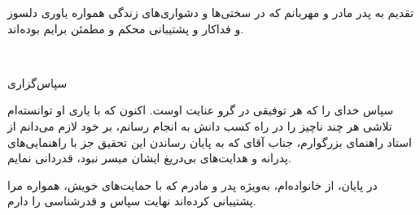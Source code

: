%
% 
%
%
\newpage
\thispagestyle{empty}
\begin{center} \Large 
{\vskip-0.1cm{\nastaliq  تقدیم به پدر مادر و مهربانم که در سختی‌ها و دشواری‌های زندگی همواره یاوری دلسوز و فداکار و پشتیبانی محکم و مطمئن برایم بوده‌اند. }}
\end{center} 
\vfill

\mbox{ }

\newpage
\thispagestyle{empty}
{\nastaliq سپاس‌گزاری}\\
\vspace{.5cm}

سپاس خدای را که هر توفيقی در گرو عنايت اوست. اکنون که با ياری او توانسته‌ام تلاشی هر چند ناچيز را در راه کسب دانش به انجام رسانم، بر خود لازم می‌دانم از استاد راهنمای بزرگوارم، جناب آقای 
{\fasupervisor} 
که به پايان رساندن اين تحقيق جز با راهنمايی‌های پدرانه و هدايت‌های بی‌دريغ ايشان ميسر نبود، قدردانی نمايم.




در پايان، از خانواده‌ام، به‌ویژه پدر و مادرم که با حمايت‌های خويش، همواره مرا پشتيبانی کرده‌اند نهايت سپاس و قدرشناسی را دارم.
\vspace{1cm}

\hspace{6cm}{ امیدوارم بتوانم از عهده ادای حق این عزیزان برآیم.}

\hspace{9cm}
\fadate
\vfill

\mbox{ }